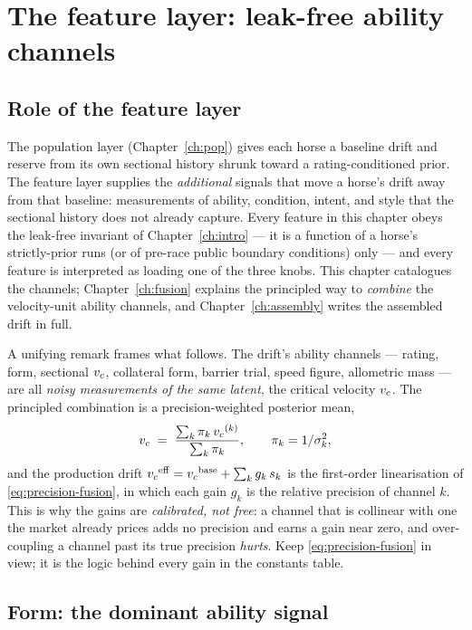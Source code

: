 \chapter{The feature layer: leak-free ability channels}
\label{ch:features}

\section{Role of the feature layer}

The population layer (Chapter~\ref{ch:pop}) gives each horse a baseline drift and reserve from its
own sectional history shrunk toward a rating-conditioned prior. The feature layer supplies the
\emph{additional} signals that move a horse's drift away from that baseline: measurements of
ability, condition, intent, and style that the sectional history does not already capture. Every
feature in this chapter obeys the leak-free invariant of Chapter~\ref{ch:intro} --- it is a
function of a horse's strictly-prior runs (or of pre-race public boundary conditions) only --- and
every feature is interpreted as loading one of the three knobs. This chapter catalogues the
channels; Chapter~\ref{ch:fusion} explains the principled way to \emph{combine} the velocity-unit
ability channels, and Chapter~\ref{ch:assembly} writes the assembled drift in full.

A unifying remark frames what follows. The drift's ability channels --- rating, form, sectional
${v_{c}}$, collateral form, barrier trial, speed figure, allometric mass --- are all \emph{noisy
measurements of the same latent}, the critical velocity ${v_{c}}$. The principled combination is a
precision-weighted posterior mean,
\begin{equation}
  {v_{c}} \;=\; \frac{\sum_k \pi_k\,{v_{c}}^{(k)}}{\sum_k \pi_k},
  \qquad \pi_k = 1/\sigma_k^2 ,
  \label{eq:precision-fusion}
\end{equation}
and the production drift ${v_{c}}^{\mathrm{eff}} = {v_{c}}^{\text{base}} + \sum_k g_k\, s_k$ is the
first-order linearisation of \eqref{eq:precision-fusion}, in which each gain $g_k$ is the relative
precision of channel $k$. This is why the gains are \emph{calibrated, not free}: a channel that
is collinear with one the market already prices adds no precision and earns a gain near zero, and
over-coupling a channel past its true precision \emph{hurts}. Keep \eqref{eq:precision-fusion} in
view; it is the logic behind every gain in the constants table.

\section{Form: the dominant ability signal}

